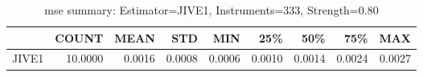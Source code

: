 \begin{table}[ht]
\centering
\caption{mse summary: Estimator=JIVE1, Instruments=333, Strength=0.80}
\begin{tabular}{lrrrrrrrr}
\toprule
 & COUNT & MEAN & STD & MIN & 25\% & 50\% & 75\% & MAX \\
\midrule
JIVE1 & 10.0000 & 0.0016 & 0.0008 & 0.0006 & 0.0010 & 0.0014 & 0.0024 & 0.0027 \\
\bottomrule
\end{tabular}
\end{table}
